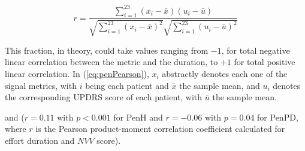 \begin{equation} \label{eq:penPearson}
r = \frac{ \sum_{i=1}^{23} (x_{i} - \bar{x})(u_{i} - \bar{u}) } 
		 { \sqrt{\sum_{i=1}^{23} (x_{i} - \bar{x})^{2}} \sqrt{\sum_{i=1}^{23} (u_{i} - \bar{u})^{2}} }
\end{equation}

\noindent
This fraction, in theory, could take values ranging from $-1$, for total negative linear correlation between the metric and the duration, to $+1$ for total positive linear correlation. In (\ref{eq:penPearson}), $x_{i}$ abstractly denotes each one of the signal metrics, with $i$ being each patient and $\bar{x}$ the sample mean, and $u_{i}$ denotes the corresponding \gls{UPDRS} score of each patient, with $\bar{u}$ the sample mean.

and ($r=0.11$ with $p<0.001$ for \gls{PenH} and $r= -0.06$ with $p=0.04$ for \gls{PenPD}, where $r$ is the Pearson product-moment correlation coefficient calculated for effort duration and $NVV$ score). 


